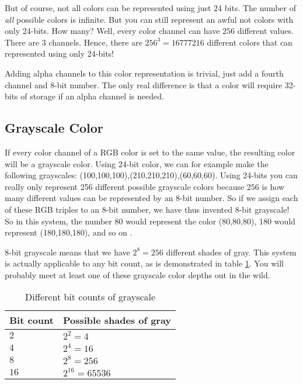 \begin{refsection}
  But of course, not all colors can be represented using just
  24 bits. The number of \textit{all} possible colors is infinite. But you can still
  represent an awful not colors with only 24-bits. How many? Well, every
  color channel can have $256$ different values. There are $3$
  channels. Hence, there are $256^3 = 16777216$ different colors that
  can represented using only 24-bits!

  \newcommand{\rgbaquad}[4]{
    \mbox{(\textcolor{red}{#1},\textcolor{green}{#2},\textcolor{blue}{#3},\textcolor{gray}{#4})}}

  Adding alpha channels to this color representation is trivial, just
  add a fourth channel and 8-bit number. The only real
  difference is that a color will require 32-bits of storage if an
  alpha channel is needed.

  \subsection{Grayscale Color}

  \newcommand{\selfrgbtrip}[3]{\mbox{\textcolor[RGB]{#1,#2,#3}{(#1,#2,#3)}}}
  \newcommand{\selfrgbtripgray}[1]{\selfrgbtrip{#1}{#1}{#1}}

  If every color channel of a RGB color is set to the same value, the
  resulting color will be a grayscale color. Using 24-bit color, we can for example make the following
  grayscales:
  \selfrgbtripgray{100},\selfrgbtripgray{210},\selfrgbtripgray{60}. Using
  24-bits you can really only represent 256 different possible
  grayscale colors because $256$ is how many different values can be
  represented by an 8-bit number. So if we assign each of these RGB
  triples to an 8-bit number, we have thus invented 8-bit
  grayscale! So in this system, the number 80
  would represent the color \selfrgbtripgray{80}, 180 would represent
  \selfrgbtripgray{180}, and so on \cite{puglia00:_handbook_dig_proj}.

  8-bit grayscale means that we have $2^8=256$ different shades of
  gray. This system is actually applicable to any bit count, as is
  demonstrated in table \ref{tab:grayscale}. You will probably meet at least one of
  these grayscale color depths out in the wild.

  \begin{table}
    \centering
    \begin{tabular}{ll}
      \toprule
      Bit count & Possible shades of gray \\
      \midrule
      $2$ & $2^2 = 4$ \\
      $4$ & $2^4 = 16$ \\
      $8$ & $2^8 = 256$ \\
      $16$ & $2^{16} = 65536$ \\
      \bottomrule
    \end{tabular}
    \caption{Different bit counts of grayscale}
    \label{tab:grayscale}
  \end{table}


\end{refsection}
